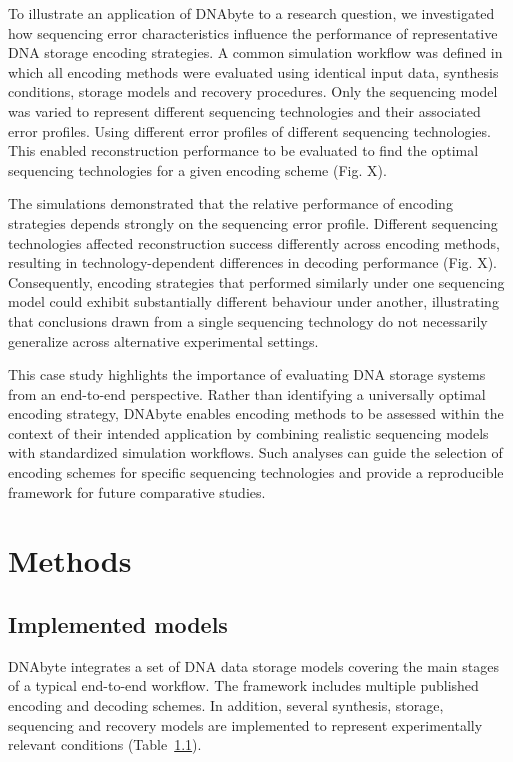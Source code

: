 \documentclass[pdflatex,sn-mathphys-num]{sn-jnl}%
\theoremstyle{thmstyleone}%
\theoremstyle{thmstyletwo}%
\theoremstyle{thmstylethree}%
\begin{document}
To illustrate an application of DNAbyte to a research question, we investigated how sequencing error characteristics influence the performance of representative DNA storage encoding strategies. A common simulation workflow was defined in which all encoding methods were evaluated using identical input data, synthesis conditions, storage models and recovery procedures. Only the sequencing model was varied to represent different sequencing technologies and their associated error profiles. Using different error profiles of different sequencing technologies. This enabled reconstruction performance to be evaluated to find the optimal sequencing technologies for a given encoding scheme (Fig. X).

The simulations demonstrated that the relative performance of encoding strategies depends strongly on the sequencing error profile. Different sequencing technologies affected reconstruction success differently across encoding methods, resulting in technology-dependent differences in decoding performance (Fig. X). Consequently, encoding strategies that performed similarly under one sequencing model could exhibit substantially different behaviour under another, illustrating that conclusions drawn from a single sequencing technology do not necessarily generalize across alternative experimental settings.

This case study highlights the importance of evaluating DNA storage systems from an end-to-end perspective. Rather than identifying a universally optimal encoding strategy, DNAbyte enables encoding methods to be assessed within the context of their intended application by combining realistic sequencing models with standardized simulation workflows. Such analyses can guide the selection of encoding schemes for specific sequencing technologies and provide a reproducible framework for future comparative studies.

\section{Methods}\label{sec11}

\subsection{Implemented models}
DNAbyte integrates a set of DNA data storage models covering the main stages of a typical end-to-end workflow. The framework includes multiple published encoding and decoding schemes. In addition, several synthesis, storage, sequencing and recovery models are implemented to represent experimentally relevant conditions (Table~\ref{}).
\end{document}
